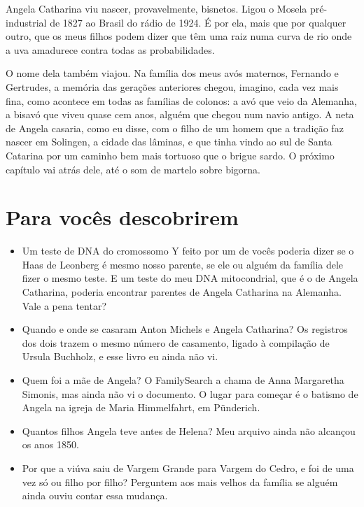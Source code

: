 \documentclass[
  brazilian,
  11pt,
  openany]{book}
\providecommand{\tightlist}{%
  \setlength{\itemsep}{0pt}\setlength{\parskip}{0pt}}
\begin{document}
Angela Catharina viu nascer, provavelmente, bisnetos. Ligou o Mosela
pré-industrial de 1827 ao Brasil do rádio de 1924. É por ela, mais que
por qualquer outro, que os meus filhos podem dizer que têm uma raiz numa
curva de rio onde a uva amadurece contra todas as probabilidades.

O nome dela também viajou. Na família dos meus avós maternos, Fernando e
Gertrudes, a memória das gerações anteriores chegou, imagino, cada vez
mais fina, como acontece em todas as famílias de colonos: a avó que veio
da Alemanha, a bisavó que viveu quase cem anos, alguém que chegou num
navio antigo. A neta de Angela casaria, como eu disse, com o filho de um
homem que a tradição faz nascer em Solingen, a cidade das lâminas, e que
tinha vindo ao sul de Santa Catarina por um caminho bem mais tortuoso
que o brigue sardo. O próximo capítulo vai atrás dele, até o som de
martelo sobre bigorna.

\section{Para vocês descobrirem}\label{para-vocuxeas-descobrirem-8}

\begin{itemize}
\tightlist
\item
  Um teste de DNA do cromossomo Y feito por um de vocês poderia dizer se
  o Haas de Leonberg é mesmo nosso parente, se ele ou alguém da família
  dele fizer o mesmo teste. E um teste do meu DNA mitocondrial, que é o
  de Angela Catharina, poderia encontrar parentes de Angela Catharina na
  Alemanha. Vale a pena tentar?
\item
  Quando e onde se casaram Anton Michels e Angela Catharina? Os
  registros dos dois trazem o mesmo número de casamento, ligado à
  compilação de Ursula Buchholz, e esse livro eu ainda não vi.
\item
  Quem foi a mãe de Angela? O FamilySearch a chama de Anna Margaretha
  Simonis, mas ainda não vi o documento. O lugar para começar é o
  batismo de Angela na igreja de Maria Himmelfahrt, em Pünderich.
\item
  Quantos filhos Angela teve antes de Helena? Meu arquivo ainda não
  alcançou os anos 1850.
\item
  Por que a viúva saiu de Vargem Grande para Vargem do Cedro, e foi de
  uma vez só ou filho por filho? Perguntem aos mais velhos da família se
  alguém ainda ouviu contar essa mudança.
\end{itemize}
\end{document}
